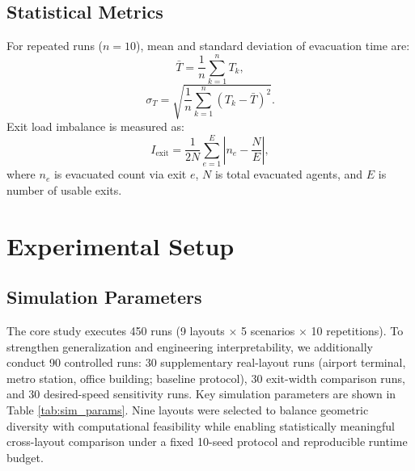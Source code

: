 \documentclass[journal]{IEEEtran}
\begin{document}
\subsection{Statistical Metrics}
For repeated runs ($n=10$), mean and standard deviation of evacuation time are:
\begin{equation}
    \bar{T}=\frac{1}{n}\sum_{k=1}^{n}T_k,
\end{equation}
\begin{equation}
    \sigma_T=\sqrt{\frac{1}{n}\sum_{k=1}^{n}(T_k-\bar{T})^2}.
\end{equation}
Exit load imbalance is measured as:
\begin{equation}
    I_{\mathrm{exit}}=\frac{1}{2N}\sum_{e=1}^{E}\left|n_e-\frac{N}{E}\right|,
\end{equation}
where $n_e$ is evacuated count via exit $e$, $N$ is total evacuated agents, and $E$ is number of usable exits.

\section{Experimental Setup}
\subsection{Simulation Parameters}
The core study executes 450 runs (9 layouts $\times$ 5 scenarios $\times$ 10 repetitions). To strengthen generalization and engineering interpretability, we additionally conduct 90 controlled runs: 30 supplementary real-layout runs (airport terminal, metro station, office building; baseline protocol), 30 exit-width comparison runs, and 30 desired-speed sensitivity runs. Key simulation parameters are shown in Table \ref{tab:sim_params}.
Nine layouts were selected to balance geometric diversity with computational feasibility while enabling statistically meaningful cross-layout comparison under a fixed 10-seed protocol and reproducible runtime budget.
\end{document}
